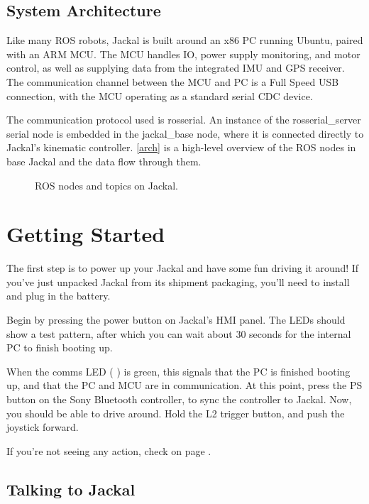 \documentclass[]{clearpath-manual}
\begin{document}
\subsection{System Architecture}

Like many ROS robots, Jackal is built around an x86 PC running Ubuntu, paired with an
ARM MCU. The MCU handles IO, power supply monitoring, and motor control, as well as
supplying data from the integrated IMU and GPS receiver. The communication channel
between the MCU and PC is a Full Speed USB connection, with the MCU operating as a
standard serial CDC device.

The communication protocol used is rosserial. An instance of the rosserial\_server
serial node is embedded in the jackal\_base node, where it is connected directly to
Jackal's kinematic controller. \autoref{arch} is a high-level overview of the ROS
nodes in base Jackal and the data flow through them.

\begin{figure}[hb]
  \centering
  \placeholder{16cm}{18cm}
  \caption{ROS nodes and topics on Jackal.}
  \label{arch}
\end{figure}

\section{Getting Started}

The first step is to power up your Jackal and have some fun driving it around! If you've
just unpacked Jackal from its shipment packaging, you'll need to install and plug in the
battery.

Begin by pressing the power button on Jackal's HMI panel. The LEDs should show a test
pattern, after which you can wait about 30 seconds for the internal PC to finish booting
up.

When the comms LED ( \placeholder{0.35cm}{0.35cm} ) is green, this signals that the PC is
finished booting up, and that the PC and MCU are in communication. At this point, press
the PS button on the Sony Bluetooth controller, to sync the controller to Jackal. Now,
you should be able to drive around. Hold the L2 trigger button, and push the joystick
forward.

If you're not seeing any action, check  on page \pageref{trouble}.

\subsection{Talking to Jackal}
\end{document}
